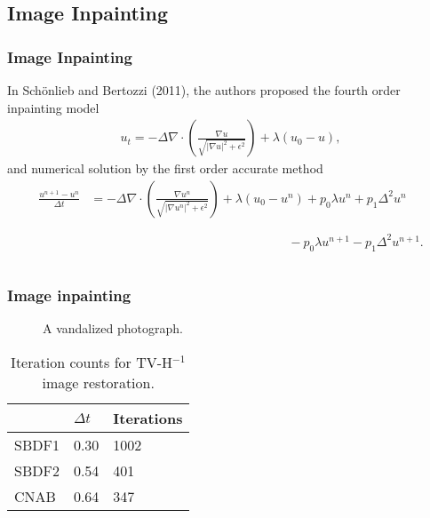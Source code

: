\documentclass[hyperref={pdfpagelabels=false}]{beamer}
\begin{document}
\subsection{Image Inpainting} 
\begin{frame}
	\frametitle{Image Inpainting} 
	In Sch\"{o}nlieb and Bertozzi (2011), the authors proposed the fourth order inpainting model 
	\begin{align*}
	u_t = -\Delta \nabla \cdot\left( \frac{\nabla u}{\sqrt{\left\vert \nabla u \right\vert^2 + \epsilon^2}} \right) + \lambda (u_0 - u),
	\end{align*}
	and numerical solution by the first order accurate method 
	\begin{align*}
	\frac{u^{n+1} - u^n}{\Delta t} 
	&=  -\Delta \nabla \cdot\left( \frac{\nabla u^n}{\sqrt{\left\vert \nabla u^n \right\vert^2 + \epsilon^2}} \right) + \lambda (u_0 - u^n)
	+ p_0\lambda u^n 
	+ p_1\Delta^2 u^n
	\\
	&\phantom{-\Delta \nabla \cdot\left( \frac{\nabla u^n}{\sqrt{\left\vert \nabla u^n \right\vert^2 + \epsilon^2}} \right) + \lambda (u_0 - u^n)}- p_0\lambda u^{n+1}  
	- p_1\Delta^2 u^{n+1}.
	\end{align*}
\end{frame}
\begin{frame}
	\frametitle{Image inpainting} 
	\begin{figure}
		\centering
\caption{A vandalized photograph.} 
	\end{figure}
	
	\begin{table}[b]
		\centering 
	\caption{Iteration counts for TV-H$^{-1}$ image restoration.}
		\begin{tabular}{lll}
			\toprule 
			& $\Delta t$ & Iterations 
			\\ \midrule 
		SBDF1 & 0.30 & 1002 
		\\ 
		SBDF2 & 0.54 & 401 
		\\ 
		CNAB & 0.64 & 347
		\\ \bottomrule
		\end{tabular}
	\end{table} 
\end{frame}
\end{document}
